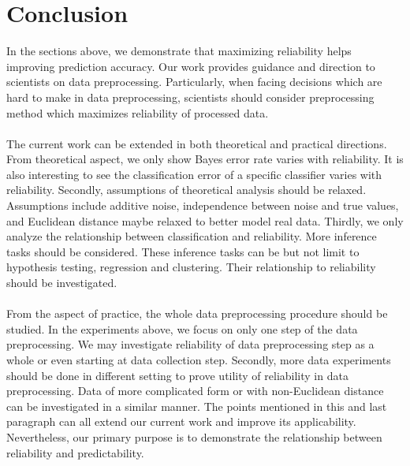 \documentclass{article}
\begin{document}
\section{Conclusion}
In the sections above, we demonstrate that maximizing reliability helps improving prediction accuracy. Our work provides guidance and direction to scientists on data preprocessing. Particularly, when facing decisions which are hard to make in data preprocessing, scientists should consider preprocessing method which maximizes reliability of processed data.\\
\\
The current work can be extended in both theoretical and practical directions. From theoretical aspect, we only show Bayes error rate varies with reliability. It is also interesting to see the classification error of a specific classifier varies with reliability. Secondly, assumptions of theoretical analysis should be relaxed. Assumptions include additive noise, independence between noise and true values, and Euclidean distance maybe relaxed to better model real data. Thirdly, we only analyze the relationship between classification and reliability. More inference tasks should be considered. These inference tasks can be but not limit to hypothesis testing, regression and clustering. Their relationship to reliability should be investigated.\\
\\ 
From the aspect of practice, the whole data preprocessing procedure should be studied. In the experiments above, we focus on only one step of the data preprocessing. We may investigate reliability of data preprocessing step as a whole or even starting at data collection step. Secondly, more data experiments should be done in different setting to prove utility of reliability in data preprocessing. Data of more complicated form or with non-Euclidean distance can be investigated in a similar manner. The points mentioned in this and last paragraph can all extend our current work and improve its applicability. Nevertheless, our primary purpose is to demonstrate the relationship between reliability and predictability.





\end{document}
